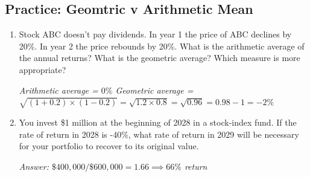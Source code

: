 \documentclass[11pt]{article}
\theoremstyle{definition}
\begin{document}
    \begin{shaded}
    \subsection{Practice: Geomtric v Arithmetic Mean}
    \begin{enumerate}
    \item Stock ABC doesn't pay dividends.   In year 1 the price of ABC declines by 20\%.   
    In year 2 the price rebounds by 20\%. What is the arithmetic average of the annual returns?   What is the geometric average?      Which measure is more appropriate?\\
    \vspace{1em}
    
   \textit{ Arithmetic average = $0\%$
    Geometric average = $\sqrt{(1+0.2) \times (1-0.2)} = \sqrt{1.2 \times 0.8} = \sqrt{0.96} = 0.98 - 1 = -2\%$}
    \vspace{1em}

    \item   You invest \$1 million at the beginning of 2028 in a stock-index fund. 
    If the rate of return in 2028 is -40\%, what rate of return in 2029 will be necessary for your 
    portfolio to recover to its original value.\\
    \vspace{1em}
    
    \textit{Answer: $\$400,000 / \$600,000 = 1.66 \implies 66\%$ return}
    \end{enumerate}

    \end{shaded}
\end{document}
